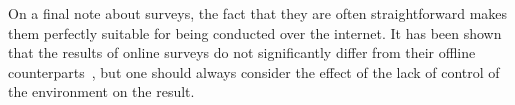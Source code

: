 On a final note about surveys, the fact that they are often straightforward makes them perfectly suitable for being conducted over the internet. It has been shown that the results of online surveys do not significantly differ from their offline counterparts~\cite{komarov2013crowdsourcing}, but one should always consider the effect of the lack of control of the environment on the result.
